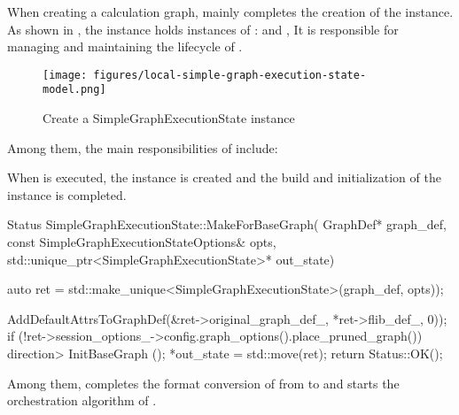 When creating a calculation graph,  mainly completes the creation of the  instance. As shown in , the  instance holds instances of :  and , It is responsible for managing and maintaining the lifecycle of .

\begin{figure}[H]
  \centering
  \texttt{[image: figures/local-simple-graph-execution-state-model.png]}
  \caption{Create a SimpleGraphExecutionState instance}
  \label{fig:local-simple-graph-execution-state-model}
\end{figure}

Among them, the main responsibilities of  include:

\begin{enum}
\end{enum}

When  is executed, the  instance is created and the build and initialization of the  instance is completed.

\begin{leftbar}
\begin{c++}
Status SimpleGraphExecutionState::MakeForBaseGraph(
    GraphDef* graph_def, const SimpleGraphExecutionStateOptions& opts,
    std::unique_ptr<SimpleGraphExecutionState>* out_state) {
  auto ret = std::make_unique<SimpleGraphExecutionState>(graph_def, opts));

  AddDefaultAttrsToGraphDef(&ret->original_graph_def_, *ret->flib_def_, 0));
  if (!ret->session_options_->config.graph_options().place_pruned_graph()) {
    direction> InitBaseGraph ();
  }
  *out_state = std::move(ret);
  return Status::OK();
}
\end{c++}
\end{leftbar}

Among them,  completes the format conversion of  from  to  and starts the  orchestration algorithm of .


